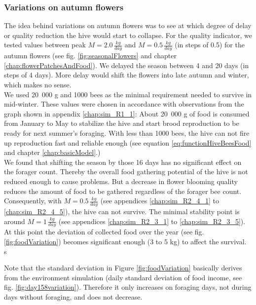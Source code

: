 	\subsubsection{Variations on autumn flowers}
		\label{chap:variationsOnAutumnFlowers}
		The idea behind variations on autumn flowers was to see at which degree of delay or quality reduction the hive would start to collapse. For the quality indicator, we tested values between peak $M = 2.0\,\frac{kg}{day}$ and $M = 0.5\,\frac{kg}{day}$ (in steps of 0.5) for the autumn flowers (see fig. \ref{fig:seasonalFlowers} and chapter \ref{chap:flowerPatchesAndFood}). We delayed the season between 4 and 20 days (in steps of 4 days). More delay would shift the flowers into late autumn and winter, which makes no sense.\\
		We used 20~000 g and 1000 bees as the minimal requirement needed to survive in mid-winter. These values were chosen in accordance with observations from the graph shown in appendix \ref{chap:sim_R1_1}: About 20~000 g of food is consumed from January to May to stabilize the hive and start brood reproduction to be ready for next summer's foraging. With less than 1000 bees, the hive can not fire up reproduction fast and reliable enough (see equation \ref{eq:functionHiveBeesFood} and chapter \ref{chap:basicModel}.)\\
		We found that shifting the season by those 16 days has no significant effect on the forager count. Thereby the overall food gathering potential of the hive is not reduced enough to cause problems. But a decrease in flower blooming quality reduces the amount of food to be gathered regardless of the forager bee count. Consequently, with $M = 0.5\,\frac{kg}{day}$ (see appendices \ref{chap:sim_R2_4_1} to \ref{chap:sim_R2_4_5}), the hive can not survive. The minimal stability point is around $M = 1\,\frac{kg}{day}$ (see appendices \ref{chap:sim_R2_3_1} to \ref{chap:sim_R2_3_5}). At this point the deviation of collected food over the year (see fig. \ref{fig:foodVariation}) becomes significant enough (3 to 5 kg) to affect the survival.\\s
		
		Note that the standard deviation in Figure \ref{fig:foodVariation} basically derives  from the environment simulation (daily standard deviation of food income, see fig. \ref{fig:day158variation}). Therefore it only increases on foraging days, not during days without foraging, and does not decrease.
		
